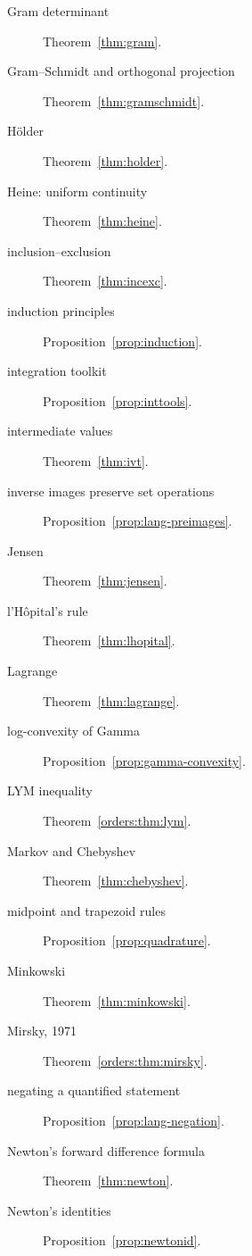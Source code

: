 \begin{description}
\item[Gram determinant] Theorem~\ref{thm:gram}.
\item[Gram--Schmidt and orthogonal projection] Theorem~\ref{thm:gramschmidt}.
\item[H\"older] Theorem~\ref{thm:holder}.
\item[Heine: uniform continuity] Theorem~\ref{thm:heine}.
\item[inclusion--exclusion] Theorem~\ref{thm:incexc}.
\item[induction principles] Proposition~\ref{prop:induction}.
\item[integration toolkit] Proposition~\ref{prop:inttools}.
\item[intermediate values] Theorem~\ref{thm:ivt}.
\item[inverse images preserve set operations] Proposition~\ref{prop:lang-preimages}.
\item[Jensen] Theorem~\ref{thm:jensen}.
\item[l'H\^opital's rule] Theorem~\ref{thm:lhopital}.
\item[Lagrange] Theorem~\ref{thm:lagrange}.
\item[log-convexity of Gamma] Proposition~\ref{prop:gamma-convexity}.
\item[LYM inequality] Theorem~\ref{orders:thm:lym}.
\item[Markov and Chebyshev] Theorem~\ref{thm:chebyshev}.
\item[midpoint and trapezoid rules] Proposition~\ref{prop:quadrature}.
\item[Minkowski] Theorem~\ref{thm:minkowski}.
\item[Mirsky, 1971] Theorem~\ref{orders:thm:mirsky}.
\item[negating a quantified statement] Proposition~\ref{prop:lang-negation}.
\item[Newton's forward difference formula] Theorem~\ref{thm:newton}.
\item[Newton's identities] Proposition~\ref{prop:newtonid}.

\end{description}
